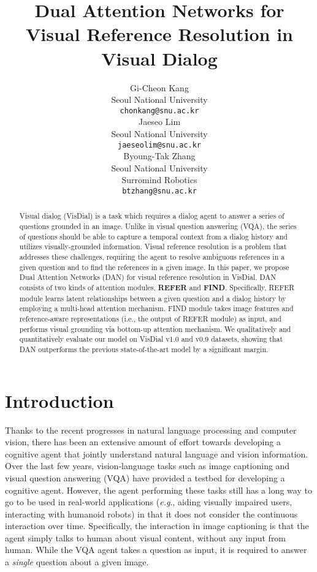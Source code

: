 \documentclass[11pt,a4paper]{article}
\title{Dual Attention Networks for Visual Reference Resolution in \\Visual Dialog}
\author{Gi-Cheon Kang\\
  Seoul National University \\
  {\tt chonkang@snu.ac.kr} \\\And
  Jaeseo Lim \\
  Seoul National University \\
  {\tt jaeseolim@snu.ac.kr} \\\And
  Byoung-Tak Zhang \\
  Seoul National University \\
  Surromind Robotics \\
  {\tt btzhang@snu.ac.kr} \\}
\date{}
\begin{document}
\maketitle
\begin{abstract}
  Visual dialog (VisDial) is a task which requires a dialog agent to answer a series of questions grounded in an image. Unlike in visual question answering (VQA), the series of questions should be able to capture a temporal context from a dialog history and utilizes visually-grounded information. Visual reference resolution is a problem that addresses these challenges, requiring the agent to resolve ambiguous references in a given question and to find the references in a given image. In this paper, we propose Dual Attention Networks (DAN) for visual reference resolution in VisDial. DAN consists of two kinds of attention modules, {\bf REFER} and {\bf FIND}. Specifically, REFER module learns latent relationships between a given question and a dialog history by employing a multi-head attention mechanism. FIND module takes image features and reference-aware representations (i.e., the output of REFER module) as input, and performs visual grounding via bottom-up attention mechanism. We qualitatively and quantitatively evaluate our model on VisDial v1.0 and v0.9 datasets, showing that DAN outperforms the previous state-of-the-art model by a significant margin.
\end{abstract}

\section{Introduction}

Thanks to the recent progresses in natural language processing and computer vision, there has been an extensive amount of effort towards developing a cognitive agent that jointly understand natural language and vision information. Over the last few years, vision-language tasks such as image captioning \cite{xu2015show} and visual question answering (VQA) \cite{antol2015vqa,Anderson2017up-down} have provided a testbed for developing a cognitive agent. However, the agent performing these tasks still has a long way to go to be used in real-world applications ({\it e.g}., aiding visually impaired users, interacting with humanoid robots) in that it does not consider the continuous interaction over time. Specifically, the interaction in image captioning is that the agent simply talks to human about visual content, without any input from human. While the VQA agent takes a question as input, it is required to answer a {\it single} question about a given image. 
\end{document}
